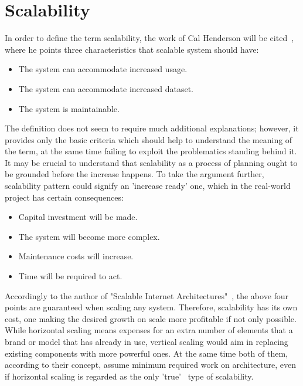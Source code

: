 \section{Scalability}\label{sec:scalability}
In order to define the term scalability, the work of Cal Henderson will be cited~\cite[pages 203--204]{build_scalable}, where he points three characteristics that scalable system should have:
\begin{itemize}
\item{The system can accommodate increased usage.}
\item{The system can accommodate increased dataset.}
\item{The system is maintainable.}
\end{itemize}
The definition does not seem to require much additional explanations; however, it provides only the basic criteria which should help to understand the meaning of the term, at the same time failing to exploit the problematics standing behind it. It may be crucial to understand that scalability as a process of planning ought to be grounded before the increase happens. To take the argument further, scalability pattern could signify an 'increase ready' one, which in the real-world project has certain consequences:
\begin{itemize}
\item{Capital investment will be made.}
\item{The system will become more complex.}
\item{Maintenance costs will increase.}
\item{Time will be required to act.}
\end{itemize}
Accordingly to the author of "Scalable Internet Architectures"~\cite[page 8]{scalable_arch}, the above four points are guaranteed when scaling any system. Therefore, scalability has its own cost, one making the desired growth on scale more profitable if not only possible. While horizontal scaling means expenses for an extra number of elements that a brand or model that has already in use, vertical scaling would aim in replacing existing components with more powerful ones. At the same time both of them, according to their concept, assume minimum required work on architecture, even if horizontal scaling is regarded as the only 'true'~\cite[page 5]{scalable_arch} type of scalability. 

